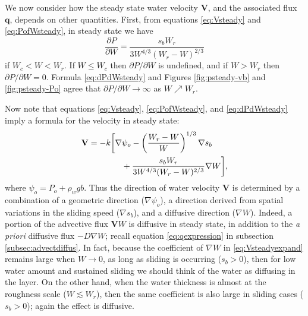 \documentclass[gmd]{copernicus}   %
\begin{document}
We now consider how the steady state water velocity $\mathbf{V}$, and the associated flux $\mathbf{q}$, depends on other quantities.  First, from equations \eqref{eq:Vsteady} and \eqref{eq:PofWsteady}, in steady state we have
\begin{equation}
\frac{\partial P}{\partial W} = \frac{s_b W_r}{3 W^{4/3} (W_r - W)^{2/3}} \label{eq:dPdWsteady}
\end{equation}
if $W_c < W < W_r$.  If $W\le W_c$ then $\partial P/\partial W$ is undefined, and if $W>W_r$ then $\partial P/\partial W=0$.  Formula \eqref{eq:dPdWsteady} and Figures \ref{fig:psteady-vb} and \ref{fig:psteady-Po} agree that $\partial P / \partial W \to \infty$ as $W \nearrow W_r$.  

Now note that equations \eqref{eq:Vsteady}, \eqref{eq:PofWsteady}, and \eqref{eq:dPdWsteady} imply a formula for the velocity in steady state:
\begin{align}
\mathbf{V} &= - k \bigg[\nabla \psi_o - \left(\frac{W_r - W}{W}\right)^{1/3} \nabla s_b \label{eq:Vsteadyexpand} \\
    & \qquad \qquad + \frac{s_b W_r}{3 W^{4/3} (W_r - W)^{2/3}} \nabla W\bigg], \notag
\end{align}
where $\psi_o = P_o + \rho_w g b$.  Thus the direction of water velocity $\mathbf{V}$ is determined by a combination of a geometric direction ($\nabla \psi_o$), a direction derived from spatial variations in the sliding speed ($\nabla s_b$), and a diffusive direction ($\nabla W$).  Indeed, a portion of the advective flux $\mathbf{V} W$ is diffusive in steady state, in addition to the \emph{a priori} diffusive flux $- D \nabla W$; recall equation \eqref{eq:qexpression} in subsection \ref{subsec:advectdiffus}.  In fact, because the coefficient of $\nabla W$ in \eqref{eq:Vsteadyexpand} remains large when $W\to 0$, as long as sliding is occurring ($s_b > 0$), then for low water amount and sustained sliding we should think of the water as diffusing in the layer.  On the other hand, when the water thickness is almost at the roughness scale ($W\lesssim W_r$), then the same coefficient is also large in sliding cases ($s_b>0$); again the effect is diffusive.


\end{document}
